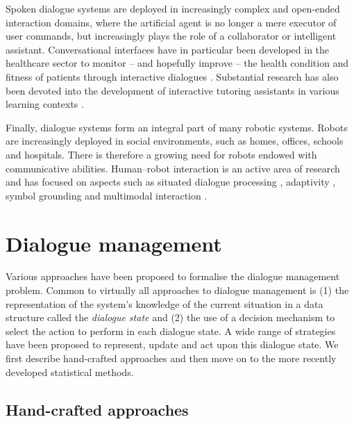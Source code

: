 Spoken dialogue systems are deployed in increasingly complex and open-ended interaction domains, where the artificial agent is no longer a mere executor of user commands, but increasingly plays the role of a collaborator or intelligent assistant.  Conversational interfaces have in particular been developed in the healthcare sector to monitor -- and hopefully improve -- the health condition and fitness of patients through interactive dialogues \citep{BickmoreG06,Stahl:2009,MorbiniFDSTR12}.  Substantial research has also been devoted into the development of interactive tutoring assistants in various learning contexts \citep{ChiVLJ11,Dzikovska:2011,jan2011,TraumAAFGKLNS12}. 

Finally, dialogue systems form an integral part of many robotic systems.  Robots are increasingly deployed in social environments, such as homes, offices, schools and hospitals.  There is therefore a growing need for robots endowed with communicative abilities. Human--robot interaction is an active area of research and has focused on aspects such as situated dialogue processing \citep{CantrellSSW10,cosybook:dialogue,Kruijff2012a}, adaptivity \citep{DoshiR08}, symbol grounding \citep{Roy05,lemaignan2012} and multimodal interaction \citep{stiefelhagen2004,salem2012,MirnigWSMGBGT13}.
 
\section{Dialogue management}
\label{sec:dm}

Various approaches have been proposed to formalise the dialogue management problem.  Common to virtually all approaches to dialogue management is (1) the representation of the system's knowledge of the current situation in a data structure called the \textit{dialogue state} and (2) the use of a decision mechanism to select the action to perform in each dialogue state. A wide range of strategies have been proposed to represent, update and act upon this dialogue state.  We first describe hand-crafted approaches and then move on to the more recently developed statistical methods. 

\subsection{Hand-crafted approaches}
\label{sec:hand-crafted}

